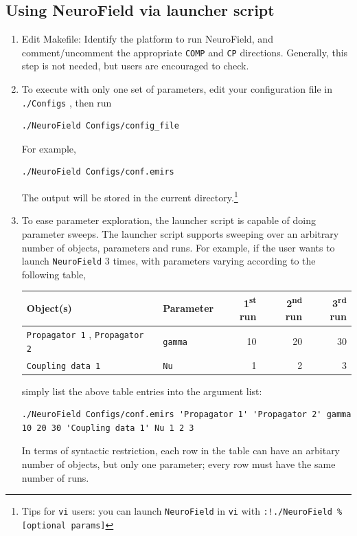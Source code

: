 \documentclass[12pt,a4paper]{article}
\newcommand{\type}[1]{ {\small\small\tt #1} }
\begin{document}
\subsection{Using NeuroField via launcher script}

\begin{enumerate}

\item Edit Makefile: Identify the platform to run NeuroField, and comment/uncomment the appropriate \type{COMP} and \type{CP} directions. Generally, this step is not needed, but users are encouraged to check.

\item To execute with only one set of parameters, edit your configuration file in \type{./Configs}, then run
\begin{lstlisting}
./NeuroField Configs/config_file
\end{lstlisting}
For example,
\begin{lstlisting}
./NeuroField Configs/conf.emirs
\end{lstlisting}
The output will be stored in the current directory.\footnote{Tips for \type{vi} users: you can launch \type{NeuroField} in \type{vi} with \type{:!./NeuroField \% [optional params]} }

\item To ease parameter exploration, the launcher script is capable of doing parameter sweeps. The launcher script supports sweeping over an arbitrary number of objects, parameters and runs. For example, if the user wants to launch \type{NeuroField} 3 times, with parameters varying according to the following table,

\begin{tabular}{l l r r r}
Object(s)&Parameter&1\textsuperscript{st} run&2\textsuperscript{nd} run&3\textsuperscript{rd} run\\
\hline
\type{Propagator 1}, \type{Propagator 2}&\type{gamma}&10&20&30\\
\type{Coupling data 1}&\type{Nu}&1&2&3
\end{tabular}

simply list the above table entries into the argument list:
\begin{lstlisting}
./NeuroField Configs/conf.emirs 'Propagator 1' 'Propagator 2' gamma 10 20 30 'Coupling data 1' Nu 1 2 3
\end{lstlisting}

In terms of syntactic restriction, each row in the table can have an arbitary number of objects, but only one parameter; every row must have the same number of runs.


\end{enumerate}
\end{document}
